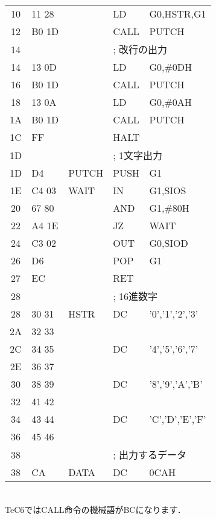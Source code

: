 \begin{center}
{\begin{tabular}{|c|l|l|l l |}
10 & 11 28         &        & LD     & G0,HSTR,G1          \\
12 & B0 1D         &        & CALL   & PUTCH               \\
14 &               &        & \multicolumn{2}{l|}{; 改行の出力} \\
14 & 13 0D         &        & LD     & G0,\#0DH            \\
16 & B0 1D         &        & CALL   & PUTCH               \\
18 & 13 0A         &        & LD     & G0,\#0AH            \\
1A & B0 1D         &        & CALL   & PUTCH               \\
1C & FF            &        & HALT   &                     \\
1D &               &        & \multicolumn{2}{l|}{; 1文字出力} \\
1D & D4            & PUTCH  & PUSH   & G1                  \\
1E & C4 03         & WAIT   & IN     & G1,SIOS             \\
20 & 67 80         &        & AND    & G1,\#80H            \\
22 & A4 1E         &        & JZ     & WAIT                \\
24 & C3 02         &        & OUT    & G0,SIOD             \\
26 & D6            &        & POP    & G1                  \\
27 & EC            &        & RET    &                     \\
28 &               &        & \multicolumn{2}{l|}{; 16進数字} \\
28 & 30 31         & HSTR   & DC     & '0','1','2','3'      \\
2A & 32 33         &        &        &                      \\
2C & 34 35         &        & DC     & '4','5','6','7'      \\
2E & 36 37         &        &        &                      \\
30 & 38 39         &        & DC     & '8','9','A','B'      \\
32 & 41 42         &        &        &                      \\
34 & 43 44         &        & DC     & 'C','D','E','F'      \\
36 & 45 46         &        &        &                      \\
38 &               &        & \multicolumn{2}{l|}{; 出力するデータ} \\
38 & CA            & DATA   & DC     & 0CAH                \\
\hline
\end{tabular}
\\TeC6ではCALL命令の機械語がBCになります．
}
\end{center}

